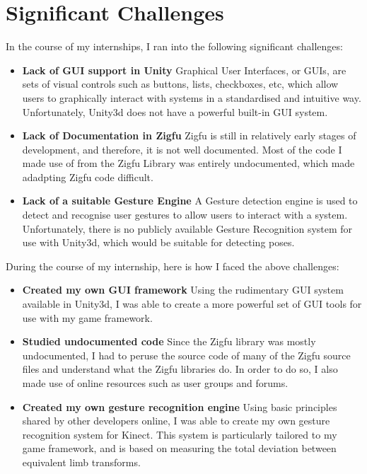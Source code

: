\documentclass{report}
\begin{document}
\section{Significant Challenges}
In the course of my internships, I ran into the following significant challenges:
\begin{itemize}
	\item \textbf{Lack of GUI support in Unity} Graphical User Interfaces, or GUIs, are sets of visual controls such as buttons, lists, checkboxes, etc, which allow users to graphically interact with systems in a standardised and intuitive way. Unfortunately, Unity3d does not have a powerful built-in GUI system. 

	\item \textbf{Lack of Documentation in Zigfu} Zigfu is still in relatively early stages of development, and therefore, it is not well documented. Most of the code I made use of from the Zigfu Library was entirely undocumented, which made adadpting Zigfu code difficult.

	\item \textbf{Lack of a suitable Gesture Engine} A Gesture detection engine is used to detect and recognise user gestures to allow users to interact with a system. Unfortunately, there is no publicly available Gesture Recognition system for use with Unity3d, which would be suitable for detecting poses. 
\end{itemize} 

During the course of my internship, here is how I faced the above challenges:

\begin{itemize}
	\item \textbf{Created my own GUI framework} Using the rudimentary GUI system available in Unity3d, I was able to create a more powerful set of GUI tools for use with my game framework. 

	\item \textbf{Studied undocumented code} Since the Zigfu library was mostly undocumented, I had to peruse the source code of many of the Zigfu source files and understand what the Zigfu libraries do. In order to do so, I also made use of online resources such as user groups and forums.

	\item \textbf{Created my own gesture recognition engine} Using basic principles shared by other developers online, I was able to create my own gesture recognition system for Kinect. This system is particularly tailored to my game framework, and is based on measuring the total deviation between equivalent limb transforms. 
		
\end{itemize}
\end{document}
